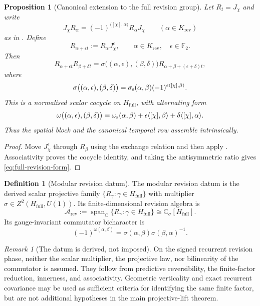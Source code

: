 \documentclass[11pt]{article}
\newtheorem{proposition}[theorem]{Proposition}
\theoremstyle{definition}
\newtheorem{definition}[theorem]{Definition}
\theoremstyle{remark}
\newtheorem{remark}[theorem]{Remark}
\newcommand{\C}{\mathbb{C}}
\newcommand{\F}{\mathbb{F}}
\newcommand{\Arev}{\mathcal{A}_{\mathrm{rev}}}
\newcommand{\Hf}{H_{\mathrm{full}}}
\begin{document}
\begin{proposition}[Canonical extension to the full revision group]
\label{prop:full-revision-cocycle-main}
Let \(R_t=J_\chi\) and write
\[
  J_\chi R_\alpha
  =(-1)^{\langle[\chi],\alpha\rangle}R_\alpha J_\chi
  \qquad(\alpha\in K_{\mathrm{rev}})
\]
as in .  Define
\[
  R_{\alpha+\epsilon t}:=R_\alpha J_\chi^\epsilon,
  \qquad \alpha\in K_{\mathrm{rev}},\quad\epsilon\in\F_2.
\]
Then
\[
  R_{\alpha+\epsilon t}R_{\beta+\delta t}
  =\sigma\bigl((\alpha,\epsilon),(\beta,\delta)\bigr)
   R_{\alpha+\beta+(\epsilon+\delta)t},
\]
where
\begin{equation}
\label{eq:full-revision-cocycle}
  \sigma\bigl((\alpha,\epsilon),(\beta,\delta)\bigr)
  =\sigma_{\rm s}(\alpha,\beta)
   (-1)^{\epsilon\langle[\chi],\beta\rangle}.
\end{equation}
This is a normalised scalar cocycle on \(\Hf\), with alternating form
\begin{equation}
\label{eq:full-revision-form}
  \omega\bigl((\alpha,\epsilon),(\beta,\delta)\bigr)
  =\omega_{\rm s}(\alpha,\beta)
   +\epsilon\langle[\chi],\beta\rangle
   +\delta\langle[\chi],\alpha\rangle.
\end{equation}
Thus the spatial block and the canonical temporal row assemble intrinsically.
\end{proposition}

\begin{proof}
Move \(J_\chi^\epsilon\) through \(R_\beta\) using the exchange relation and
then apply .  Associativity proves the
cocycle identity, and taking the antisymmetric ratio gives
\eqref{eq:full-revision-form}.
\end{proof}

\begin{definition}[Modular revision datum]
\label{def:revision-operators-main}
The modular revision datum is the derived scalar projective family
\(\{R_\gamma:\gamma\in\Hf\}\) with multiplier
\(\sigma\in Z^2(\Hf,U(1))\).  Its finite-dimensional revision algebra is
\[
  \Arev:=\operatorname{span}_{\C}\{R_\gamma:\gamma\in\Hf\}
  \cong\C_\sigma[\Hf].
\]
Its gauge-invariant commutator bicharacter is
\[
  (-1)^{\omega(\alpha,\beta)}
  =\sigma(\alpha,\beta)\sigma(\beta,\alpha)^{-1}.
\]
\end{definition}

\begin{remark}[The datum is derived, not imposed]
\label{rem:revision-datum-assumption}
On the signed recurrent revision phase, neither the scalar multiplier, the
projective law, nor bilinearity of the commutator is assumed.  They follow from
predictive reversibility, the finite-factor reduction, innerness, and
associativity.  Geometric verticality and exact recurrent covariance may be
used as sufficient criteria for identifying the same finite factor, but are not
additional hypotheses in the main projective-lift theorem.
\end{remark}
\end{document}
